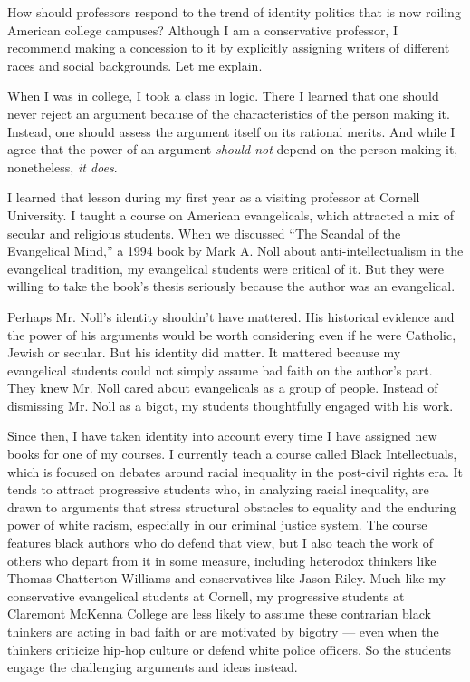 How should professors respond to the trend of identity politics that is
now roiling American college campuses? Although I am a conservative
professor, I recommend making a concession to it by explicitly assigning
writers of different races and social backgrounds. Let me explain.

When I was in college, I took a class in logic. There I learned that one
should never reject an argument because of the characteristics of the
person making it. Instead, one should assess the argument itself on its
rational merits. And while I agree that the power of an argument
\emph{should not} depend on the person making it, nonetheless, \emph{it
does}.

I learned that lesson during my first year as a visiting professor at
Cornell University. I taught a course on American evangelicals, which
attracted a mix of secular and religious students. When we discussed
``The Scandal of the Evangelical Mind,'' a 1994 book by Mark A. Noll
about anti-intellectualism in the evangelical tradition, my evangelical
students were critical of it. But they were willing to take the book's
thesis seriously because the author was an evangelical.

Perhaps Mr. Noll's identity shouldn't have mattered. His historical
evidence and the power of his arguments would be worth considering even
if he were Catholic, Jewish or secular. But his identity did matter. It
mattered because my evangelical students could not simply assume bad
faith on the author's part. They knew Mr. Noll cared about evangelicals
as a group of people. Instead of dismissing Mr. Noll as a bigot, my
students thoughtfully engaged with his work.

Since then, I have taken identity into account every time I have
assigned new books for one of my courses. I currently teach a course
called Black Intellectuals, which is focused on debates around racial
inequality in the post-civil rights era. It tends to attract progressive
students who, in analyzing racial inequality, are drawn to arguments
that stress structural obstacles to equality and the enduring power of
white racism, especially in our criminal justice system. The course
features black authors who do defend that view, but I also teach the
work of others who depart from it in some measure, including heterodox
thinkers like Thomas Chatterton Williams and conservatives like Jason
Riley. Much like my conservative evangelical students at Cornell, my
progressive students at Claremont McKenna College are less likely to
assume these contrarian black thinkers are acting in bad faith or are
motivated by bigotry --- even when the thinkers criticize hip-hop
culture or defend white police officers. So the students engage the
challenging arguments and ideas instead.

